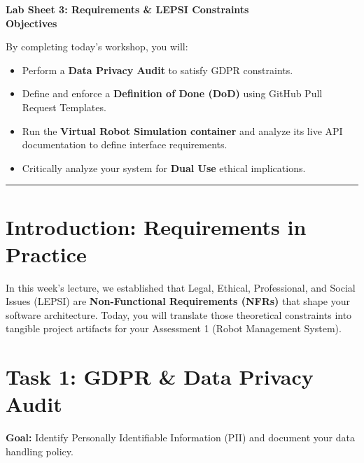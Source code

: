 \documentclass[a4paper,12pt]{article}
\begin{document}

\begin{center}
    \LARGE \textbf{Lab Sheet 3: Requirements \& LEPSI Constraints} \\
    \vspace{0.5cm}
    \large \textbf{Objectives}
\end{center}

\noindent By completing today's workshop, you will:
\begin{itemize}
    \item Perform a \textbf{Data Privacy Audit} to satisfy GDPR constraints.
    \item Define and enforce a \textbf{Definition of Done (DoD)} using GitHub Pull Request Templates.
    \item Run the \textbf{Virtual Robot Simulation container} and analyze its live API documentation to define interface requirements.
    \item Critically analyze your system for \textbf{Dual Use} ethical implications.
\end{itemize}

\vspace{0.5cm}
\hrule
\vspace{0.5cm}

\section*{Introduction: Requirements in Practice}
In this week's lecture, we established that Legal, Ethical, Professional, and Social Issues (LEPSI) are \textbf{Non-Functional Requirements (NFRs)} that shape your software architecture. Today, you will translate those theoretical constraints into tangible project artifacts for your Assessment 1 (Robot Management System).


\section*{Task 1: GDPR \& Data Privacy Audit}

\textbf{Goal:} Identify Personally Identifiable Information (PII) and document your data handling policy.
\end{document}

